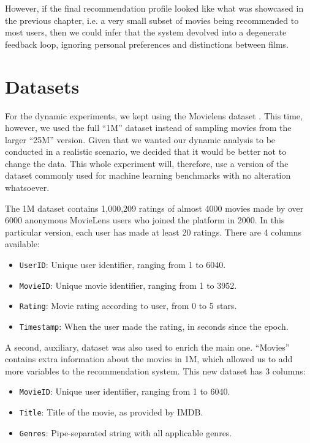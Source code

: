 However, if the final recommendation profile looked like what was showcased in
the previous chapter, i.e. a very small subset of movies being recommended to
most users, then we could infer that the system devolved into a degenerate
feedback loop, ignoring personal preferences and distinctions between films.

\section{Datasets}
\label{sec:datasets04}

For the dynamic experiments, we kept using the Movielens dataset \citep{}. This
time, however, we used the full ``1M'' dataset instead of sampling movies from
the larger ``25M'' version. Given that we wanted our dynamic analysis to be
conducted in a realistic scenario, we decided that it would be better not to
change the data. This whole experiment will, therefore, use a version of the
dataset commonly used for machine learning benchmarks with no alteration
whatsoever.

The 1M dataset contains 1,000,209 ratings of almost 4000 movies made by over
6000 anonymous MovieLens users who joined the platform in 2000. In this
particular version, each user has made at least 20 ratings. There are 4 columns
available:

\begin{itemize}
  \item \verb|UserID|: Unique user identifier, ranging from 1 to 6040.
  \item \verb|MovieID|: Unique movie identifier, ranging from 1 to 3952.
  \item \verb|Rating|: Movie rating according to user, from 0 to 5 stars.
  \item \verb|Timestamp|: When the user made the rating, in seconds since the
  epoch.
\end{itemize}

A second, auxiliary, dataset was also used to enrich the main one. ``Movies''
contains extra information about the movies in 1M, which allowed us to add more
variables to the recommendation system. This new dataset has 3 columns:

\begin{itemize}
  \item \verb|MovieID|: Unique user identifier, ranging from 1 to 6040.
  \item \verb|Title|: Title of the movie, as provided by IMDB.
  \item \verb|Genres|: Pipe-separated string with all applicable genres.
\end{itemize}

